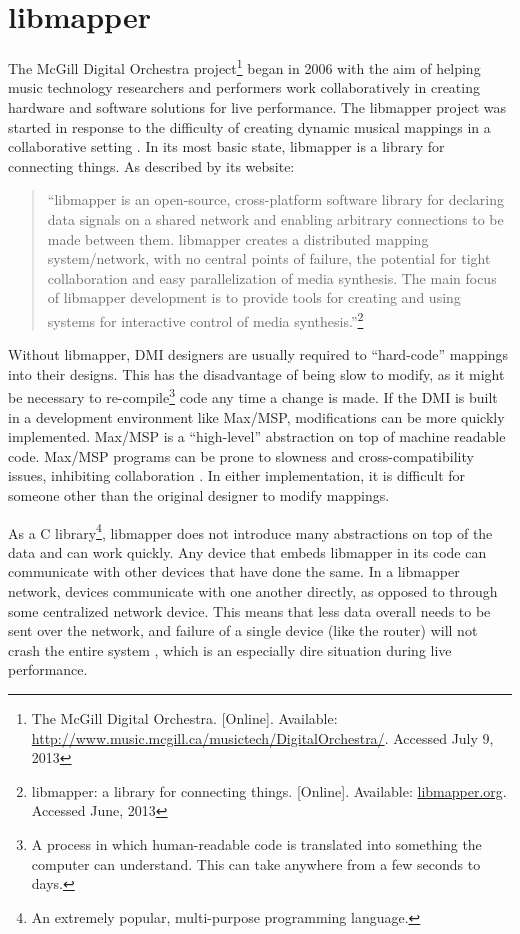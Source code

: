 
\chapter{libmapper}

The McGill Digital Orchestra project\footnote{The McGill Digital Orchestra. [Online]. Available: \url{http://www.music.mcgill.ca/musictech/DigitalOrchestra/}. Accessed July 9, 2013} began in 2006 with the aim of helping music technology researchers and performers work collaboratively in creating hardware and software solutions for live performance. The libmapper project was started in response to the difficulty of creating dynamic musical mappings in a collaborative setting . In its most basic state, libmapper is a library for connecting things. As described by its website: 

\begin{quote} 
``libmapper is an open-source, cross-platform software library for declaring data signals on a shared network and enabling arbitrary connections to be made between them. libmapper creates a distributed mapping system/network, with no central points of failure, the potential for tight collaboration and easy parallelization of media synthesis. The main focus of libmapper development is to provide tools for creating and using systems for interactive control of media synthesis.''\footnote{libmapper: a library for connecting things. [Online]. Available: \url{libmapper.org}. Accessed June, 2013}
\end{quote}

Without libmapper, DMI designers are usually required to ``hard-code'' mappings into their designs. This has the disadvantage of being slow to modify, as it might be necessary to re-compile\footnote{A process in which human-readable code is translated into something the computer can understand. This can take anywhere from a few seconds to days.} code any time a change is made. If the DMI is built in a development environment like Max/MSP, modifications can be more quickly implemented. Max/MSP is a ``high-level'' abstraction on top of machine readable code. Max/MSP programs can be prone to slowness and cross-compatibility issues, inhibiting collaboration . In either implementation, it is difficult for someone other than the original designer to modify mappings.

As a C library\footnote{An extremely popular, multi-purpose programming language.}, libmapper does not introduce many abstractions on top of the data and can work quickly. Any device that embeds libmapper in its code can communicate with other devices that have done the same. In a libmapper network, devices communicate with one another directly, as opposed to through some centralized network device. This means that less data overall needs to be sent over the network, and failure of a single device (like the router) will not crash the entire system , which is an especially dire situation during live performance.

